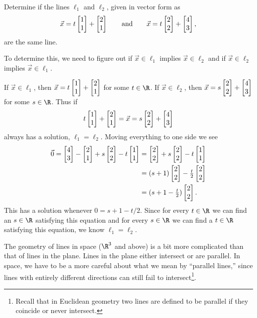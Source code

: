 \begin{example}
	Determine if the lines $\ell_1$ and $\ell_2$, given in vector form as 
	\[
		\vec x=t\mat{1\\1}+\mat{2\\1}\qquad\text{and}\qquad
		\vec x=t\mat{2\\2}+\mat{4\\3},
	\]
	are the same line.  
	
	To determine this, we need to figure out if $\vec x\in\ell_1$
	implies $\vec x\in \ell_2$ and if $\vec x\in\ell_2$ implies $\vec x\in\ell_1$.

	If $\vec x\in\ell_1$, then $\vec x=t\mat{1\\1}+\mat{2\\1}$ for some $t\in\R$.  If
	$\vec x\in\ell_2$, then $\vec x=s\mat{2\\2}+\mat{4\\3}$ for some $s\in \R$.  Thus if
	\[
		t\mat{1\\1}+\mat{2\\1} = \vec x = s\mat{2\\2}+\mat{4\\3}
	\]
	always has a solution, $\ell_1=\ell_2$.  Moving everything to one side we see
	\begin{align*}
		\vec 0 = \mat{4\\3}-\mat{2\\1} + s\mat{2\\2}-t\mat{1\\1}
		&=\mat{2\\2}+s\mat{2\\2}-t\mat{1\\1}\\
		&=(s+1)\mat{2\\2}-\tfrac{t}{2}\mat{2\\2}\\
		&= (s+1-\tfrac{t}{2})\mat{2\\2}.
	\end{align*}
	This has a solution whenever $0=s+1-t/2$.  Since for every $t\in\R$ we can find an $s\in\R$ satisfying
	this equation
	and for every $s\in \R$ we can find a $t\in \R$ satisfying this equation, we know $\ell_1=\ell_2$.
\end{example}


The geometry of lines in space ($\R^3$ and above) is a bit more complicated than that of lines
in the plane.  Lines in the plane either intersect or are parallel.
In space,  we have to be a more careful about what we mean by
``parallel lines,'' since lines with entirely different directions can
still fail to intersect\footnote{ Recall that in Euclidean geometry
two lines are defined to be parallel if they coincide or never intersect.}.

